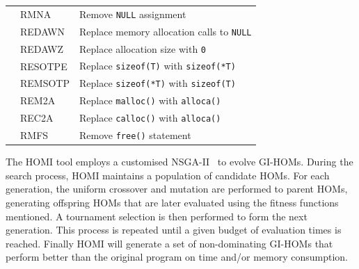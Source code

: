 \documentclass[oribibl]{llncs}
\begin{document}
\begin{table}[ht]
\begin{center}
\begin{tabular}{lll}
& RMNA    & Remove \texttt{NULL} assignment \\
& REDAWN  & Replace memory allocation calls to \texttt{NULL} \\
& REDAWZ  & Replace allocation size with \texttt{0} \\
& RESOTPE & Replace \texttt{sizeof(T)} with \texttt{sizeof(*T)} \\
& REMSOTP & Replace \texttt{sizeof(*T)} with \texttt{sizeof(T)} \\
& REM2A   & Replace \texttt{malloc()} with \texttt{alloca()} \\
& REC2A   & Replace \texttt{calloc()} with \texttt{alloca()} \\
& RMFS    & Remove \texttt{free()} statement \\
\hline
\end{tabular}
\end{center}
\end{table}
\vspace{-8mm}



The HOMI tool employs a customised NSGA-II~\cite{996017} to evolve GI-HOMs. During the search process, HOMI maintains a population of candidate HOMs. For each generation,  the uniform crossover and mutation are performed to parent HOMs, generating offspring HOMs that are later evaluated using the fitness functions mentioned. A tournament selection is then performed to form the next generation. This process is repeated until a given budget of evaluation times is reached. Finally HOMI will generate a set of non-dominating GI-HOMs that perform better than the original program on time and/or memory consumption.
\end{document}
